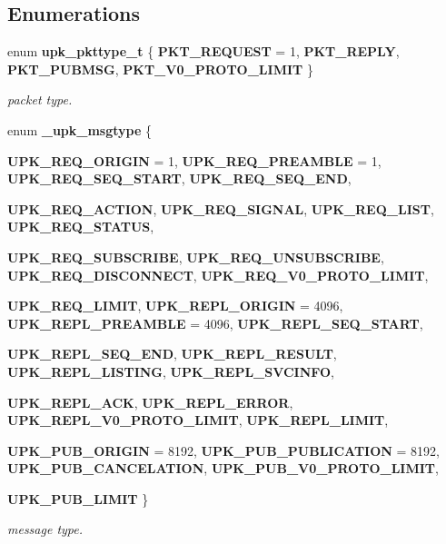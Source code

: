 \subsection*{Enumerations}
\begin{DoxyCompactItemize}
\item 
enum {\bf upk\_\-pkttype\_\-t} \{ {\bf PKT\_\-REQUEST} =  1, 
{\bf PKT\_\-REPLY}, 
{\bf PKT\_\-PUBMSG}, 
{\bf PKT\_\-V0\_\-PROTO\_\-LIMIT}
 \}
\begin{DoxyCompactList}\small\item\em packet type. \end{DoxyCompactList}\item 
enum {\bf \_\-upk\_\-msgtype} \{ \par
{\bf UPK\_\-REQ\_\-ORIGIN} =  1, 
{\bf UPK\_\-REQ\_\-PREAMBLE} =  1, 
{\bf UPK\_\-REQ\_\-SEQ\_\-START}, 
{\bf UPK\_\-REQ\_\-SEQ\_\-END}, 
\par
{\bf UPK\_\-REQ\_\-ACTION}, 
{\bf UPK\_\-REQ\_\-SIGNAL}, 
{\bf UPK\_\-REQ\_\-LIST}, 
{\bf UPK\_\-REQ\_\-STATUS}, 
\par
{\bf UPK\_\-REQ\_\-SUBSCRIBE}, 
{\bf UPK\_\-REQ\_\-UNSUBSCRIBE}, 
{\bf UPK\_\-REQ\_\-DISCONNECT}, 
{\bf UPK\_\-REQ\_\-V0\_\-PROTO\_\-LIMIT}, 
\par
{\bf UPK\_\-REQ\_\-LIMIT}, 
{\bf UPK\_\-REPL\_\-ORIGIN} =  4096, 
{\bf UPK\_\-REPL\_\-PREAMBLE} =  4096, 
{\bf UPK\_\-REPL\_\-SEQ\_\-START}, 
\par
{\bf UPK\_\-REPL\_\-SEQ\_\-END}, 
{\bf UPK\_\-REPL\_\-RESULT}, 
{\bf UPK\_\-REPL\_\-LISTING}, 
{\bf UPK\_\-REPL\_\-SVCINFO}, 
\par
{\bf UPK\_\-REPL\_\-ACK}, 
{\bf UPK\_\-REPL\_\-ERROR}, 
{\bf UPK\_\-REPL\_\-V0\_\-PROTO\_\-LIMIT}, 
{\bf UPK\_\-REPL\_\-LIMIT}, 
\par
{\bf UPK\_\-PUB\_\-ORIGIN} =  8192, 
{\bf UPK\_\-PUB\_\-PUBLICATION} =  8192, 
{\bf UPK\_\-PUB\_\-CANCELATION}, 
{\bf UPK\_\-PUB\_\-V0\_\-PROTO\_\-LIMIT}, 
\par
{\bf UPK\_\-PUB\_\-LIMIT}
 \}
\begin{DoxyCompactList}\small\item\em message type. \end{DoxyCompactList}\end{DoxyCompactItemize}
